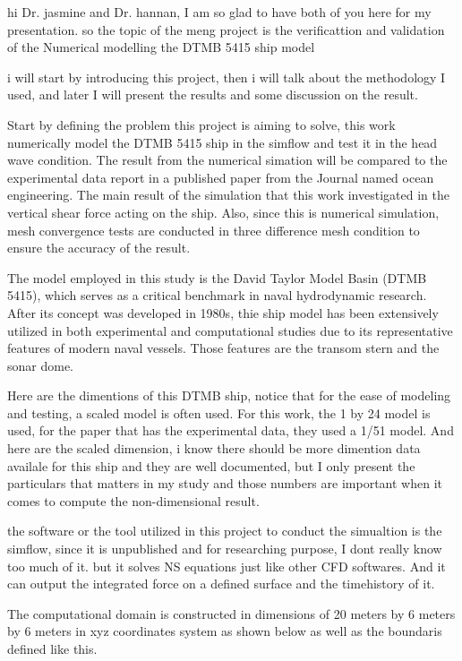 \documentclass[17pt]{extarticle} %
\begin{document}
\setlength{\parskip}{1em} 
\setlength{\parindent}{0pt}
hi Dr. jasmine and Dr. hannan, I am so glad to have both of you here for my presentation.
so the topic of the meng project is the verificattion and validation of the Numerical
modelling the DTMB 5415 ship model

i will start by introducing this project, then i will talk about the methodology I used, 
and later I will present the results and some discussion on the result.

Start by defining the problem this project is aiming to solve, this work numerically 
model the DTMB 5415 ship in the simflow and test it in the head wave condition. The
result from the numerical simation will be compared to the experimental data report in a published
paper from the Journal named ocean engineering. The main result of the simulation that this work 
investigated in the vertical shear force acting on the ship. Also, since this is numerical simulation,
mesh convergence tests are conducted in three difference mesh condition to ensure the accuracy of the result.

The model employed in this study is the David Taylor Model Basin (DTMB 5415), which serves as a 
critical benchmark in naval hydrodynamic research. After its concept was developed in 1980s, thie ship model 
has been extensively utilized in both experimental and computational studies due to its representative features of modern naval vessels.
Those features are the transom stern and the sonar dome.

Here are the dimentions of this DTMB ship, notice that for the ease of modeling and testing, a scaled model is often used.
For this work, the 1 by 24 model is used, for the paper that has the experimental data, they used a 1/51 model.
And here are the scaled dimension, i know there should be more dimention data availale for this ship and they are well documented,
but I only present the particulars that matters in my study and those numbers are important when it comes to compute the non-dimensional result.

the software or the tool utilized in this project to conduct the simualtion is the simflow, since it is unpublished and for researching 
purpose, I dont really know too much of it. but it solves NS equations just like other CFD softwares. And it can
output the integrated force on a defined surface and the timehistory of it.

The computational domain is constructed in dimensions of 20 meters by 6 meters by 6 meters in xyz coordinates 
system as shown below as well as the boundaris defined like this.
\end{document}
